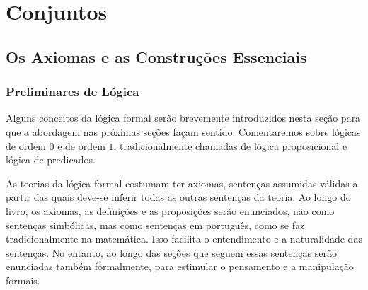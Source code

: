 \part{Conjuntos}

\chapter{Os Axiomas e as Construções Essenciais}

\section{Preliminares de Lógica}

Alguns conceitos da lógica formal serão brevemente introduzidos nesta seção para que a abordagem nas próximas seções façam sentido. Comentaremos sobre lógicas de ordem $0$ e de ordem $1$, tradicionalmente chamadas de lógica proposicional e lógica de predicados.

As teorias da lógica formal costumam ter axiomas, sentenças assumidas válidas a partir das quais deve-se inferir todas as outras sentenças da teoria. Ao longo do livro, os axiomas, as definições e as proposições serão enunciados, não como sentenças simbólicas, mas como sentenças em português, como se faz tradicionalmente na matemática. Isso facilita o entendimento e a naturalidade das sentenças. No entanto, ao longo das seções que seguem essas sentenças serão enunciadas também formalmente, para estimular o pensamento e a manipulação formais.

